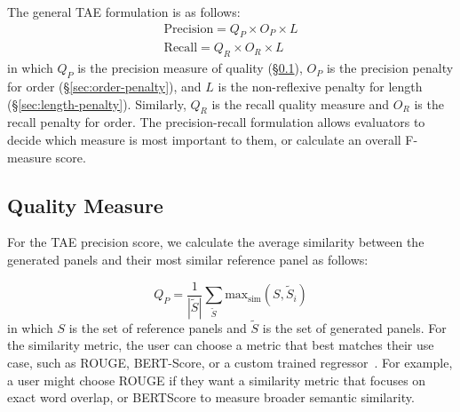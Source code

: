 The general TAE formulation is as follows: 
\begin{equation}
    \begin{split}
    \mathrm{Precision} = Q_P \times O_P \times L \\
    \mathrm{Recall} = Q_R \times O_R \times L
    \end{split}
\end{equation}
\noindent
in which $Q_P$ is the precision measure of quality (\S\ref{sec:qual-measure}), $O_P$ is the precision penalty for order (\S\ref{sec:order-penalty}), and $L$ is the non-reflexive penalty for length (\S\ref{sec:length-penalty}). 
Similarly, $Q_R$ is the recall quality measure and $O_R$ is the recall penalty for order. The precision-recall formulation allows evaluators to decide which measure is most important to them, or calculate an overall F-measure score. 



\subsection{Quality Measure}\label{sec:qual-measure}

For the TAE precision score, we calculate the average similarity between the generated panels and their most similar reference panel as follows:%

\begin{equation}
    Q_P = \frac{1}{|\tilde{S}|} \sum_{\tilde{S}} \mathrm{max}_{\mathrm{sim}}( S, \tilde{S}_i )
\end{equation}
\noindent
in which $S$ is the set of reference panels and $\tilde{S}$ is the set of generated panels. 
For the similarity metric, the user can choose a metric that best matches their use case, such as ROUGE, BERT-Score, or a custom trained regressor~\cite{lin2004rouge,zhang2020bertscore}. For example, a user might choose ROUGE if they want a similarity metric that focuses on exact word overlap, or BERTScore to measure broader semantic similarity.

